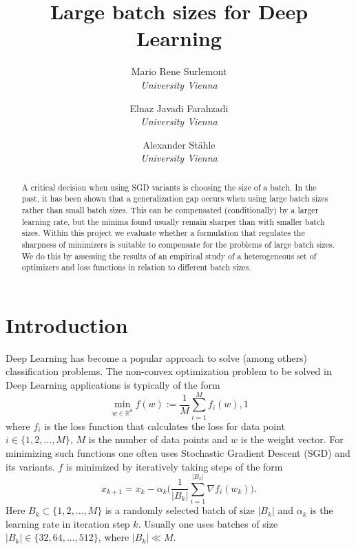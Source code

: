 \documentclass[10pt,conference,compsocconf]{IEEEtran}
\begin{document}
\title{Large batch sizes for Deep Learning}
\author{
  Mario Rene Surlemont\\
  \textit{University Vienna}\and Elnaz Javadi Farahzadi\\
  \textit{University Vienna}\and Alexander Stähle\\
  \textit{University Vienna}
}

\maketitle

\begin{abstract}
A critical decision when using SGD variants is choosing the size of a batch. In the past, it has been shown that a generalization gap occurs when using large batch sizes rather than small batch sizes. This can be compensated (conditionally) by a larger learning rate, but the minima found usually remain sharper than with smaller batch sizes. Within this project we evaluate whether a formulation that regulates the sharpness of minimizers is suitable to compensate for the problems of large batch sizes. We do this by assessing the results of an empirical study of a heterogeneous set of optimizers and loss functions in relation to different batch sizes. 
\end{abstract}

\section{Introduction}
\label{sec:introduction}
Deep Learning has become a popular approach to solve (among others) classification problems. 
The non-convex optimization problem to be solved in Deep Learning applications is typically of the form 
\begin{equation} \label{eq:loss}
\min_{w \in \mathbb{R}^d}{f(w) := \frac{1}{M} \sum_{i = 1}^M{f_i(w)}},1
\end{equation}
where $f_i$ is the loss function that calculates the loss for data point $i \in \{1, 2, ..., M\}$, $M$ is the number of data points and $w$ is the weight vector. 
For minimizing such functions one often uses Stochastic Gradient Descent (SGD) and its variants. $f$ is minimized by iteratively taking steps of the form
\begin{equation}
x_{k+1} = x_k - \alpha_k \biggl(\frac{1}{|B_k|} \sum_{i = 1}^{|B_k|}{\nabla f_i(w_k) \biggl)}.
\end{equation}
Here $B_k \subset \{1,2,..., M\}$ is a randomly selected batch of size $|B_k|$ and $\alpha_k$ is the learning rate in iteration step $k$. Usually one uses batches of size $|B_k| \in \{32, 64, ..., 512\}$, where $|B_k| \ll M$. 
\end{document}

